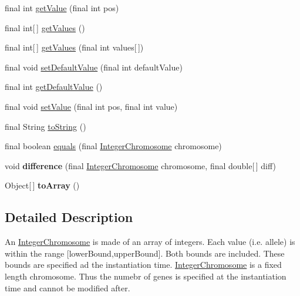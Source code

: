 \begin{CompactItemize}
\item 
final int \hyperlink{classjenes_1_1chromosome_1_1_integer_chromosome_5bc96e2224ca980bd9e13e0416426e1d}{getValue} (final int pos)
\item 
final int\mbox{[}$\,$\mbox{]} \hyperlink{classjenes_1_1chromosome_1_1_integer_chromosome_a9e195726837440d8b65c9fc4268624c}{getValues} ()
\item 
final int\mbox{[}$\,$\mbox{]} \hyperlink{classjenes_1_1chromosome_1_1_integer_chromosome_dc4af1dfafa5c20d92ee91a79d289317}{getValues} (final int values\mbox{[}$\,$\mbox{]})
\item 
final void \hyperlink{classjenes_1_1chromosome_1_1_integer_chromosome_682f03e84e51f0e132a657b25236d432}{setDefaultValue} (final int defaultValue)
\item 
final int \hyperlink{classjenes_1_1chromosome_1_1_integer_chromosome_ac608f3599a9289d510e0ee7bc34fbc9}{getDefaultValue} ()
\item 
final void \hyperlink{classjenes_1_1chromosome_1_1_integer_chromosome_2d2aa7705d11a8ca21493c82bf334f74}{setValue} (final int pos, final int value)
\item 
final String \hyperlink{classjenes_1_1chromosome_1_1_integer_chromosome_ac7f634cd0b9449d2db45a87a0773ba3}{toString} ()
\item 
final boolean \hyperlink{classjenes_1_1chromosome_1_1_integer_chromosome_58904190bf6c0d3f3b34dd584dab91b7}{equals} (final \hyperlink{classjenes_1_1chromosome_1_1_integer_chromosome}{IntegerChromosome} chromosome)
\item 
\hypertarget{classjenes_1_1chromosome_1_1_integer_chromosome_69f90fc799f3d0534bc32f6f509f89fc}{
void \textbf{difference} (final \hyperlink{classjenes_1_1chromosome_1_1_integer_chromosome}{IntegerChromosome} chromosome, final double\mbox{[}$\,$\mbox{]} diff)}
\label{classjenes_1_1chromosome_1_1_integer_chromosome_69f90fc799f3d0534bc32f6f509f89fc}

\item 
\hypertarget{classjenes_1_1chromosome_1_1_integer_chromosome_c1fa490d6a64bcd765982f57235fb04a}{
Object\mbox{[}$\,$\mbox{]} \textbf{toArray} ()}
\label{classjenes_1_1chromosome_1_1_integer_chromosome_c1fa490d6a64bcd765982f57235fb04a}

\end{CompactItemize}


\subsection{Detailed Description}
An \hyperlink{classjenes_1_1chromosome_1_1_integer_chromosome}{IntegerChromosome} is made of an array of integers. Each value (i.e. allele) is within the range \mbox{[}lowerBound,upperBound\mbox{]}. Both bounds are included. These bounds are specified ad the instantiation time. \hyperlink{classjenes_1_1chromosome_1_1_integer_chromosome}{IntegerChromosome} is a fixed length chromosome. Thus the numebr of genes is specified at the instantiation time and cannot be modified after.

